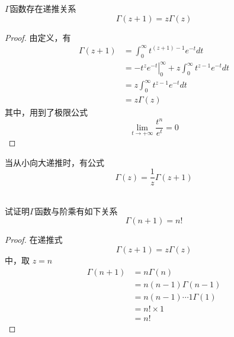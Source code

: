 	\begin{proposition}
		$\Gamma$函数存在递推关系
	\begin{equation}
		\boxed{\Gamma(z+1)=z \Gamma(z)}
	\end{equation}
	\end{proposition}
	\begin{proof}
		由定义，有
	\[\begin{aligned}
		\Gamma(z+1)&= \int_{0}^{\infty} t^{(z+1)-1} e^{-t} dt \\
			&= \left.-t^z e^{-t} \right\vert_{0}^{\infty} + z \int_{0}^{\infty} t^{z-1} e^{-t} dt \\
			&= z \int_{0}^{\infty} t^{z-1} e^{-t} dt \\
			&=z \Gamma(z)
	\end{aligned}\]
	其中，用到了极限公式
	$$
	\lim _{t \rightarrow+\infty} \frac{t^n}{e^t}=0
	$$
	\end{proof}
	当从小向大递推时，有公式
	\begin{equation}
		\boxed{\Gamma(z)= \frac{1}{z}\Gamma(z+1)} 
	\end{equation}
	~~\\
	
	\begin{example}
		试证明$\Gamma$函数与阶乘有如下关系
	\begin{equation}
		\boxed{\Gamma(n+1)=n!} 
	\end{equation}
	\end{example}
	\begin{proof}
	在递推式
	\begin{equation*}
		\Gamma(z+1)=z \Gamma(z)
	\end{equation*}
	中，取 $z=n$
	\[\begin{aligned}
		\Gamma(n+1)&=n \Gamma(n) \\
		&=n(n-1) \Gamma(n-1) \\
		&=n(n-1)\cdots 1 \Gamma(1) \\
		&=n! \times 1 \\
		&=n!
	\end{aligned}\]
	\end{proof}
	~~\\
	
